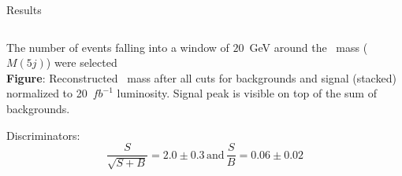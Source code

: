 \begin{frame}{Results}
\vspace{-.2cm}

\begin{columns}
\begin{column}{.50\textwidth}
\begin{block}{}\scriptsize
The number of events falling into a window of $20$~GeV around the \Tp~mass ($M(5j)$) were selected\\
\textbf{Figure}: Reconstructed \Tp~mass after all cuts for backgrounds and signal (stacked) normalized to 20~$fb^{-1}$ luminosity. Signal peak is visible on top of the sum of backgrounds.

\begin{center}
\end{center}

Discriminators:
\begin{equation*}                                               
\frac{S}{\sqrt{S+B}}=2.0\pm 0.3\, \mbox{and} \, \frac{S}{B}=0.06\pm 0.02                                               
\end{equation*}
\end{block}
\end{column}


\end{columns}
\end{frame}

